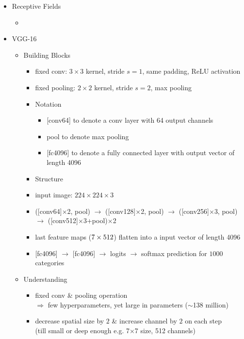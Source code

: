 \begin{itemize}
\item Receptive Fields
	\begin{itemize}
	\item 
	\end{itemize}

\item VGG-16
	\begin{itemize}
	\item Building Blocks
		\begin{itemize}
		\item fixed conv: $3\times3$ kernel, stride $s=1$, same padding, ReLU activation
		\item fixed pooling: $2\times2$ kernel, stride $s=2$, max pooling
	\item Notation
		\begin{itemize}
		\item{} [conv64] to denote a conv layer with 64 output channels
		\item pool to denote max pooling
		\item{} [fc4096] to denote a fully connected layer with output vector of length 4096
		\end{itemize}
	\item Structure
		\item input image: $224\times224\times3$
		\item{} ([conv64]$\times$2, pool) $\rightarrow$ ([conv128]$\times$2, pool) $\rightarrow$ ([conv256]$\times$3, pool) $\rightarrow$ ([conv512]$\times$3+pool)$\times$2
		\item last feature maps ($7\time7\times512$) flatten into a input vector of length 4096
		\item{} [fc4096] $\rightarrow$ [fc4096] $\rightarrow$ logits $\rightarrow$ softmax prediction for $1000$ categories
		\end{itemize}
	\item Understanding
		\begin{itemize}
		\item fixed conv \& pooling operation \\
		$\Rightarrow$ few hyperparameters, yet large in parameters ($\sim$138 million)
		\item decrease spatial size by $2$ \& increase channel by $2$ on each step \\ 
		(till small or deep enough e.g. 7$\times$7 size, 512 channels)
		\end{itemize}
	\end{itemize}


\end{itemize}
